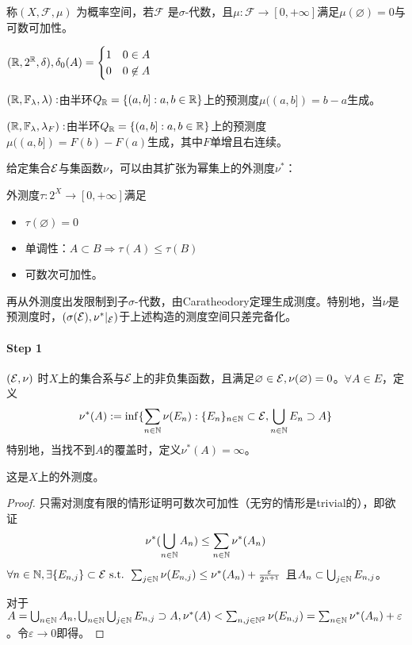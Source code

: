 \documentclass{ctexart}
\begin{document}
\begin{Def}[概率空间]
  称$(X,\mathcal{F},\mu)$ 为概率空间，若$\mathcal{F}$ 是$\sigma$-代数，且$\mu:\mathcal{F}\to [0,+\infty]$满足$\mu(\varnothing)=0$与可数可加性。
\end{Def}
\begin{Eg}[Dirac测度]
  $(\mathbb{R},2^{\mathbb{R}},\delta),\delta_{0}(A)=\begin{cases}1&0\in A\\0&0\not\in A\end{cases}$
\end{Eg}
\begin{Eg}[Lebesgue测度]
  $(\mathbb{R},\mathbb{F}_{\lambda},\lambda):$由半环$Q_{\mathbb{R}}=\{(a,b]:a,b\in\mathbb{R}\}$上的预测度$\mu((a,b])=b-a$生成。
\end{Eg}

\begin{Eg}
  $(\mathbb{R},\mathbb{F}_{\lambda},\lambda_{F}):$由半环$Q_{\mathbb{R}}=\{(a,b]:a,b\in\mathbb{R}\}$上的预测度$\mu((a,b])=F(b)-F(a)$生成，其中$F$单增且右连续。  
\end{Eg}

给定集合$\mathcal{E}$与集函数$\nu$，可以由其扩张为幂集上的外测度$\nu^{*}$：
\begin{Def}[外测度]
  外测度$\tau:2^{X}\to[0,+\infty]$满足
  \begin{itemize}
  \item $\tau(\varnothing)=0$
  \item 单调性：$A\subset B\Rightarrow \tau(A)\leq \tau(B)$
  \item 可数次可加性。
  \end{itemize}
\end{Def}

再从外测度出发限制到子$\sigma$-代数，由Caratheodory定理生成测度。特别地，当$\nu$是预测度时，$(\sigma(\mathcal{E}),\nu^{*}|_{\mathcal{E}})$于上述构造的测度空间只差完备化。

\paragraph{Step 1}
\begin{Prop}
  $(\mathcal{E},\nu)$ 时$X$上的集合系与$\mathcal{E}$上的非负集函数，且满足$\varnothing\in\mathcal{E},\nu(\varnothing)=0$。$\forall A\in E$，定义
  \[\nu^{*}(A):=\inf\{\sum_{n\in \mathbb{N}}\nu(E_{n}):\{E_{n}\}_{n\in\mathbb{N}}\subset\mathcal{E},\bigcup_{n\in\mathbb{N}}E_{n}\supset A\}\]
  特别地，当找不到$A$的覆盖时，定义$\nu^{*}(A)=\infty$。

  这是$X$上的外测度。
\end{Prop}

\begin{proof}
  只需对测度有限的情形证明可数次可加性（无穷的情形是trivial的），即欲证
  \[\nu^{*}(\bigcup_{n\in\mathbb{N}}A_{n})\leq \sum_{n\in\mathbb{N}}\nu^{*}(A_{n})\]
  $\forall n\in \mathbb{N},\exists \{E_{n,j}\}\subset \mathcal{E}\text{ s.t. } \sum_{j\in\mathbb{N}}\nu(E_{n,j})\leq \nu^{*}(A_{n})+\frac{\varepsilon}{2^{n+1}}$ 且$A_{n}\subset \bigcup_{j\in\mathbb{N}}E_{n,j}$。

  对于$A=\bigcup_{n\in \mathbb{N}}A_{n}, \bigcup_{n\in\mathbb{N}}\bigcup_{j\in \mathbb{N}}E_{n,j}\supset A,\nu^{*}(A)<\sum_{n,j\in\mathbb{N}^{2}}\nu(E_{n,j})=\sum_{n\in\mathbb{N}}\nu^{*}(A_{n})+\varepsilon$。令$\varepsilon\to 0$即得。
\end{proof}
\end{document}
